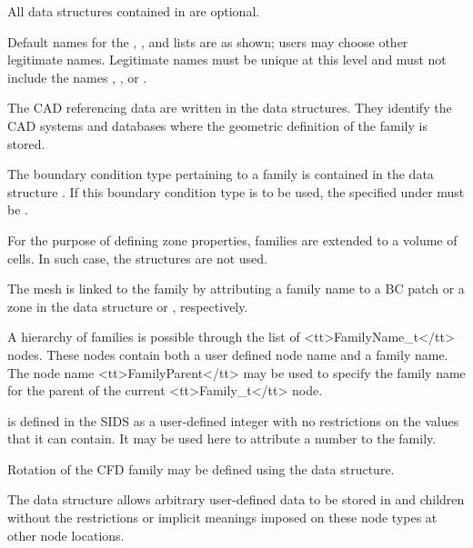 \begin{notes}
\item All data structures contained in  are optional.
\item Default names for the ,
      , and  lists
      are as shown; users may choose other legitimate names.
      Legitimate names must be unique at this level and must
      not include the names , , or
      .
\item The CAD referencing data are written in the
       data structures.
      They identify the CAD systems and databases where the geometric
      definition of the family is stored.
\item The boundary condition type pertaining to a family is contained in
      the data structure .
      If this boundary condition type is to be used, the 
      specified under  must be .
\item For the purpose of defining zone properties, families are extended
      to a volume of cells.
      In such case, the  structures are not
      used.
\item The mesh is linked to the family by attributing a family name
      to a BC patch or a zone in the data structure  or
      , respectively.
\item A hierarchy of families is possible through the list of <tt>FamilyName\_t</tt>
      nodes. These nodes contain both a user defined node name and a
      family name. The node name \linebreak <tt>FamilyParent</tt> may be used to specify
      the family name for the parent of the current <tt>Family\_t</tt> node.
\item {} is defined in the SIDS as a user-defined integer
      with no restrictions on the values that it can contain.
      It may be used here to attribute a number to the family.
\end{notes}

Rotation of the CFD family may be defined using the
 data structure.

The  data structure allows arbitrary
user-defined data to be stored in  and
 children without the restrictions or implicit
meanings imposed on these node types at other node locations.

